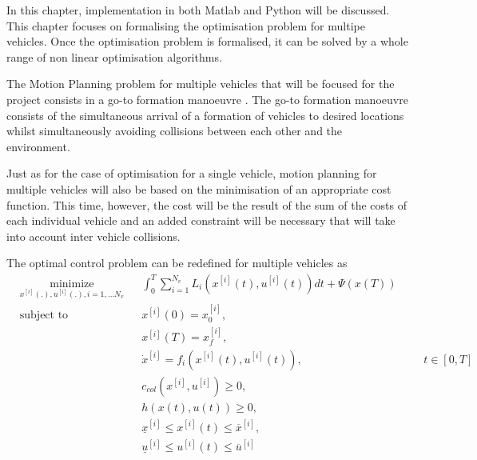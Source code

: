 \cleardoublepage
\label{chap:implementation}

\par In this chapter, implementation in both Matlab and Python will be discussed. This chapter focuses on formalising the optimisation problem for multipe vehicles. Once the optimisation problem is formalised, it can be solved by a whole range of non linear optimisation algorithms.

\par The Motion Planning problem for multiple vehicles that will be focused for the project consists in a go-to formation manoeuvre \cite{sabetghadam2018cooperative}. The go-to formation manoeuvre consists of the simultaneous arrival of a formation of vehicles to desired locations whilst simultaneously avoiding collisions between each other and the environment.

\par Just as for the case of optimisation for a single vehicle, motion planning for multiple vehicles will also be based on the minimisation of an appropriate cost function. This time, however, the cost will be the result of the sum of the costs of each individual vehicle and an added constraint will be necessary that will take into account inter vehicle collisions. 

\par The optimal control problem can be redefined for multiple vehicles as 
\begin{equation}
    \label{eq:multi_cost}
    \begin{aligned}
    & \underset{x^{[i]}(.),u^{[i]}(.),i= 1,\dots N_v}{\text{minimize}} && \int_0^T \sum_{i=1}^{N_v}  L_i (x^{[i]}(t),u^{[i]}(t))dt + \Psi (x(T)) \\
    & \text{subject to}  && x^{[i]}(0) = x_0^{[i]}, \\
        & && x^{[i]}(T) = x_f^{[i]}, \\
        & && \dot{x}^{[i]} = f_i (x^{[i]}(t), u^{[i]}(t)), &&& t \in [0,T]\\
        & && c_{col} (x^{[i]},u^{[i]} ) \geq 0, \\
        & && h(x(t),u(t)) \geq 0, \\
        & && \underline{x}^{[i]} \leq x^{[i]} (t) \leq \overline{x}^{[i]} , \\
        & && \underline{u}^{[i]} \leq u^{[i]} (t) \leq \overline{u}^{[i]}
    \end{aligned}
\end{equation}


